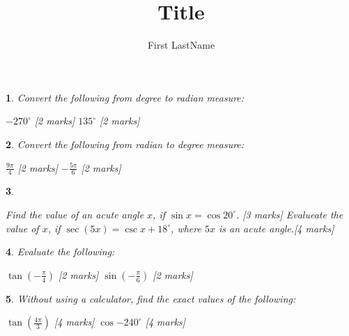 \documentclass{article}
\title{Title}
\author{First LastName}
\theoremstyle{custom}
\newtheorem{question}{}
\begin{document}
\begin{question}
    Convert the following from degree to radian measure:
    \begin{tasks}
        \task $-270^{\circ}$ \hfill[2 marks]
        \vspace{7 cm}
        \task $135^{\circ}$ \hfill[2 marks]
        \vspace{7 cm}
    \end{tasks}
\end{question}

\begin{question}
    Convert the following from radian to degree measure:
    \begin{tasks}
        \task $\frac{9\pi}{4}$ \hfill[2 marks]
        \vspace{7 cm}
        \task $-\frac{5\pi}{6}$ \hfill[2 marks]
        \vspace{7 cm}
    \end{tasks}
\end{question}

\begin{question}
    \begin{tasks}
        \task Find the value of an acute angle $x$, if $\sin{x} = \cos{20^{\circ}}$. \hfill[3 marks]
        \vspace{7 cm}
        \task Evalueate the value of $x$, if $\sec(5x) = \csc{x + 18^{\circ}}$, where $5x$ is an acute angle.\hfill[4 marks]
        \vspace{7 cm}
    \end{tasks}
\end{question}

\begin{question}
    Evaluate the following:
    \begin{tasks}
        \task $\tan{(-\frac{\pi}{4})}$ \hfill[2 marks]
        \vspace{7 cm}
        \task $\sin{(-\frac{\pi}{6})}$ \hfill[2 marks]
        \vspace{7 cm}
    \end{tasks}
\end{question}

\begin{question}
    Without using a calculator, find the exact values of the following:
    \begin{tasks}
        \task $\tan{(\frac{4\pi}{3})}$ \hfill[4 marks]
        \vspace{7 cm}
        \task $\cos{-240^{\circ}}$ \hfill[4 marks]
        \vspace{7 cm}
    \end{tasks}
\end{question}
\end{document}
